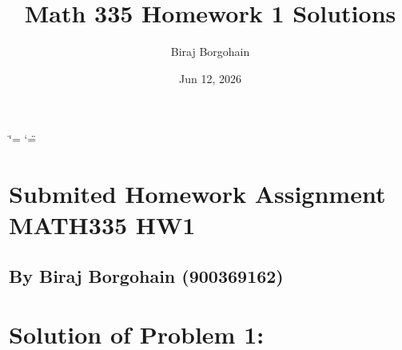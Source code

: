 \documentclass[letterpaper,10pt,english]{sphinxmanual}
\title{Math 335 Homework 1 Solutions}
\date{Jun 12, 2026}
\author{Biraj Borgohain}
\begin{document}
\ifdefined\shorthandoff
  \ifnum\catcode`\=\string=\active\shorthandoff{=}\fi
  \ifnum\catcode`\"=\active{}\fi
\fi

\pagestyle{empty}
\sphinxmaketitle
\pagestyle{plain}

\pagestyle{normal}
\label{\detokenize{Language/Science_language/ODE_calculus/course_MATH_3035/homework_assignments/index_pdf::doc}}



\section{Submited Homework Assignment MATH335 HW1}
\label{\detokenize{Language/Science_language/ODE_calculus/course_MATH_3035/homework_assignments/index_pdf:submited-homework-assignment-math335-hw1}}

\subsection{By Biraj Borgohain (900369162)}
\label{\detokenize{Language/Science_language/ODE_calculus/course_MATH_3035/homework_assignments/index_pdf:by-biraj-borgohain-900369162}}

\section{Solution of Problem 1:}
\label{\detokenize{Language/Science_language/ODE_calculus/course_MATH_3035/homework_assignments/index_pdf:solution-of-problem-1}}
\end{document}
